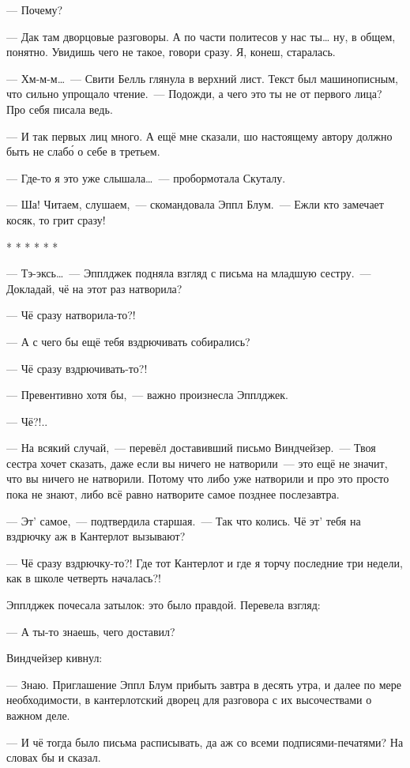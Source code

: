 \documentclass[fontsize=11pt,a5paper,titlepage=firstcover]{scrbook}
\begin{document}
--- Почему?

--- Дак там дворцовые разговоры. А по части политесов у нас ты{\ldots} ну, в общем, понятно. Увидишь чего не такое, говори сразу. Я, конеш, старалась.

--- Хм-м-м{\ldots}~--- Свити Белль глянула в верхний лист. Текст был машинописным, что сильно упрощало чтение.~--- Подожди, а чего это ты не от первого лица? Про себя писала ведь.

--- И так первых лиц много. А ещё мне сказали, шо настоящему автору должно быть не слабо́ о себе в третьем.

--- Где-то я это уже слышала{\ldots}~--- пробормотала Скуталу.

--- Ша! Читаем, слушаем,~--- скомандовала Эппл Блум.~--- Ежли кто замечает косяк, то грит сразу!
\begin{center}* * * * * *\end{center}

--- Тэ-эксь{\ldots}~--- Эпплджек подняла взгляд с письма на младшую сестру.~--- Докладай, чё на этот раз натворила?

--- Чё сразу натворила-то?!

--- А с чего бы ещё тебя вздрючивать собирались?

--- Чё сразу вздрючивать-то?!

--- Превентивно хотя бы,~--- важно произнесла Эпплджек.

--- Чё?!..

--- На всякий случай,~--- перевёл доставивший письмо Виндчейзер.~--- Твоя сестра хочет сказать, даже если вы ничего не натворили~--- это ещё не значит, что вы ничего не натворили. Потому что либо уже натворили и про это просто пока не знают, либо всё равно натворите самое позднее послезавтра.

--- Эт’ самое,~--- подтвердила старшая.~--- Так что колись. Чё эт’ тебя на вздрючку аж в Кантерлот вызывают?

--- Чё сразу вздрючку-то?! Где тот Кантерлот и где я торчу последние три недели, как в школе четверть началась?!

Эпплджек почесала затылок: это было правдой. Перевела взгляд:

--- А ты-то знаешь, чего доставил?

Виндчейзер кивнул:

--- Знаю. Приглашение Эппл Блум прибыть завтра в десять утра, и далее по мере необходимости, в кантерлотский дворец для разговора с их высочествами о важном деле.

--- И чё тогда было письма расписывать, да аж со всеми подписями-печатями? На словах бы и сказал.
\end{document}
